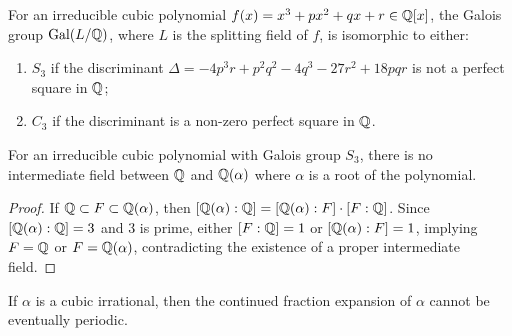 \begin{theorem}\label{thm:cubic_galois}
For an irreducible cubic polynomial $f(x) = x^3 + px^2 + qx + r \in \mathbb{Q}[x]$, the Galois group $\operatorname{Gal}(L/\mathbb{Q})$, where $L$ is the splitting field of $f$, is isomorphic to either:
\begin{enumerate}
    \item $S_3$ if the discriminant $\Delta = -4p^3r + p^2q^2 - 4q^3 - 27r^2 + 18pqr$ is not a perfect square in $\mathbb{Q}$;
    \item $C_3$ if the discriminant is a non-zero perfect square in $\mathbb{Q}$.
\end{enumerate}
\end{theorem}

\begin{proposition}\label{prop:no_intermediate_field}
For an irreducible cubic polynomial with Galois group $S_3$, there is no intermediate field between $\mathbb{Q}$ and $\mathbb{Q}(\alpha)$ where $\alpha$ is a root of the polynomial.
\end{proposition}

\begin{proof}
If $\mathbb{Q} \subset F \subset \mathbb{Q}(\alpha)$, then $[\mathbb{Q}(\alpha):\mathbb{Q}] = [\mathbb{Q}(\alpha):F] \cdot [F:\mathbb{Q}]$. Since $[\mathbb{Q}(\alpha):\mathbb{Q}] = 3$ and 3 is prime, either $[F:\mathbb{Q}] = 1$ or $[\mathbb{Q}(\alpha):F] = 1$, implying $F = \mathbb{Q}$ or $F = \mathbb{Q}(\alpha)$, contradicting the existence of a proper intermediate field.
\end{proof}

\begin{theorem}\label{thm:non_periodicity}
If $\alpha$ is a cubic irrational, then the continued fraction expansion of $\alpha$ cannot be eventually periodic.
\end{theorem}

